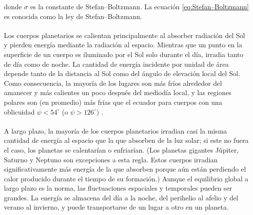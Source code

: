 \documentclass[12pt]{article}
\begin{document}
donde $\sigma$ es la constante de Stefan–Boltzmann. La ecuación \ref{eq:Stefan–Boltzmann} es conocida como la ley de 
Stefan–Boltzmann.\\
\\
Los cuerpos planetarios se calientan principalmente al absorber radiación del Sol y pierden energía 
mediante la radiación al espacio. Mientras que un punto en la superficie de un cuerpo es iluminado por 
el Sol solo durante el día, irradia tanto de día como de noche. La cantidad de energía incidente por 
unidad de área depende tanto de la distancia al Sol 
como del ángulo de elevación local del Sol. Como consecuencia, la mayoría de los lugares son más fríos 
alrededor del amanecer y más calientes un poco después del mediodía local, y las regiones polares son 
(en promedio) más frías que el ecuador para cuerpos con una oblicuidad 
$\psi < 54^\circ$ (o $\psi > 126^\circ$) \parencite{PLanet_formation}.\\
\\
A largo plazo, la mayoría de los cuerpos planetarios irradian casi la misma cantidad de energía al 
espacio que la que absorben de la luz solar; si este no fuera el caso, los planetas se calentarían o 
enfriarían. (Los planetas gigantes Júpiter, Saturno y Neptuno son excepciones a esta regla. 
Estos cuerpos irradian significativamente más energía de la que absorben porque aún están perdiendo el 
calor producido durante el tiempo de su formación.) Aunque el equilibrio global a largo plazo es la norma, 
las fluctuaciones espaciales y temporales pueden ser grandes. La energía se almacena del día a la noche, 
del perihelio al afelio y del verano al invierno, y puede transportarse de un lugar a otro en un planeta.
\end{document}
